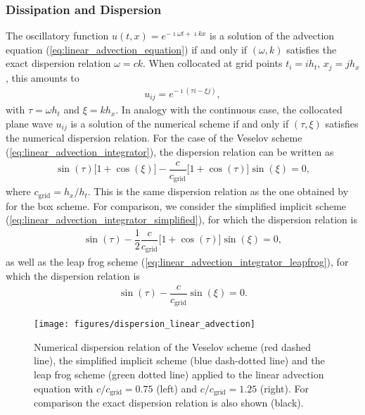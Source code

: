 \documentclass[12pt,a4paper,reqno]{article}
\begin{document}
\subsubsection{Dissipation and Dispersion}

The oscillatory function $u(t,x) = e^{- \imath \omega t + \imath k x}$ is a solution of the advection equation (\ref{eq:linear_advection_equation}) if and only if $(\omega, k)$ satisfies the exact dispersion relation $\omega = ck$.
When collocated at grid points $t_i = i h_t$, $x_j = j h_x$, this amounts to
\begin{align}
  u_{ij} = e^{- \imath (\tau i - \xi j)},
\end{align}
with $\tau = \omega h_t$ and $\xi = k h_x$. In analogy with the continuous case, the collocated plane wave $u_{ij}$ is a solution of the numerical scheme if and only if $(\tau, \xi)$ satisfies the numerical dispersion relation. 
For the case of the Veselov scheme (\ref{eq:linear_advection_integrator}), the dispersion relation can be written as
\begin{align}\label{eq:linear_advection_dispersion_veselov}
  \sin (\tau) \big[ 1 + \cos(\xi) \big] - \dfrac{c}{c_{\text{grid}}} \big[ 1 + \cos(\tau) \big] \sin(\xi)
  = 0 ,
\end{align}
where $c_{\text{grid}} = h_x / h_t$.
This is the same dispersion relation as the one obtained by \citet{AscherMcLachlan:2004} for the box scheme.
For comparison, we consider the simplified implicit scheme (\ref{eq:linear_advection_integrator_simplified}), for which the dispersion relation is
\begin{align}\label{eq:linear_advection_dispersion_simplified}
  \sin (\tau) - \dfrac{1}{2} \dfrac{c}{c_{\text{grid}}} \big[ 1 + \cos(\tau) \big] \sin(\xi)
  = 0 ,
\end{align}
as well as the leap frog scheme (\ref{eq:linear_advection_integrator_leapfrog}), for which the dispersion relation is
\begin{align}\label{eq:linear_advection_dispersion_leapfrog}
  \sin(\tau) - \dfrac{c}{c_{\text{grid}}} \sin(\xi) = 0.
\end{align}

\begin{figure}[t]
  \texttt{[image: figures/dispersion\_linear\_advection]}
  \caption{\label{fig:linear_advection_dispersion_relation} Numerical dispersion relation of the Veselov scheme (red dashed line), the simplified implicit scheme (blue dash-dotted line) and the leap frog scheme (green dotted line) applied to the linear advection equation with $c/c_{\text{grid}} = 0.75$ (left) and $c/c_{\text{grid}} = 1.25$ (right). For comparison the exact dispersion relation is also shown (black).} 
\end{figure}
\end{document}
